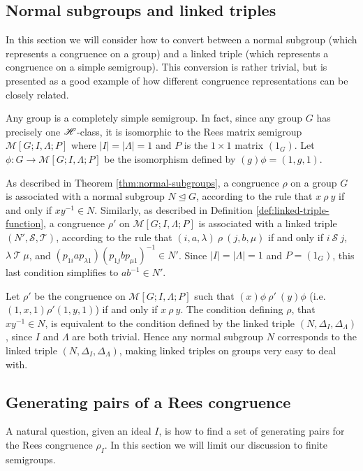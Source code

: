 \subsection{Normal subgroups and linked triples}
\label{sec:normal-subgroup-to-linked-triple}
In this section we will consider how to convert between a normal subgroup (which
represents a congruence on a group) and a linked triple (which represents a
congruence on a simple semigroup).  This conversion is rather trivial, but is
presented as a good example of how different congruence representations can be
closely related.

Any group is a completely simple semigroup.  In fact, since any group $G$ has
precisely one $\mathrel{\mathscr{H}}$-class, it is isomorphic to the Rees matrix semigroup
$\mathcal{M}[G; I, \Lambda; P]$ where $|I|=|\Lambda|={1}$ and $P$ is the
$1 \times 1$ matrix $(1_G)$.  Let $\phi: G \to \mathcal{M}[G; I, \Lambda; P]$ be
the isomorphism defined by $(g)\phi = (1, g, 1)$.

As described in Theorem \ref{thm:normal-subgroups}, a congruence $\rho$ on a
group $G$ is associated with a normal subgroup $N \trianglelefteq G$, according
to the rule that $x ~\rho~ y$ if and only if $xy^{-1} \in N$.  Similarly, as
described in Definition \ref{def:linked-triple-function}, a congruence $\rho'$
on $\mathcal{M}[G; I, \Lambda; P]$ is associated with a linked triple
$(N', \mathcal{S}, \mathcal{T})$, according to the rule that
$(i, a, \lambda) ~\rho~ (j, b, \mu)$ if and only if $i ~\mathcal{S}~ j$,
$\lambda ~\mathcal{T}~ \mu$, and
$(p_{1 i} a p_{\lambda 1}) (p_{1 j} b p_{\mu 1})^{-1} \in N'$.
Since $|I|=|\Lambda|={1}$ and $P=(1_G)$, this last condition simplifies to
$ab^{-1} \in N'$.

Let $\rho'$ be the congruence on $\mathcal{M}[G; I, \Lambda; P]$ such that
$(x)\phi ~\rho'~ (y)\phi$ (i.e.~$(1,x,1) \mathrel{\rho'} (1,y,1)$) if and only if
$x ~\rho~ y$.  The condition defining $\rho$, that $xy^{-1} \in N$, is
equivalent to the condition defined by the linked triple
$(N, \Delta_I, \Delta_\Lambda)$, since $I$ and $\Lambda$ are both trivial.
Hence any normal subgroup $N$ corresponds to the linked triple
$(N, \Delta_I, \Delta_\Lambda)$, making linked triples on groups very easy to
deal with.

\subsection{Generating pairs of a Rees congruence}
\label{sec:rees-to-pairs}
A natural question, given an ideal $I$, is how to find a set of generating pairs
for the Rees congruence $\rho_I$.  In this section we will limit our discussion
to finite semigroups.

